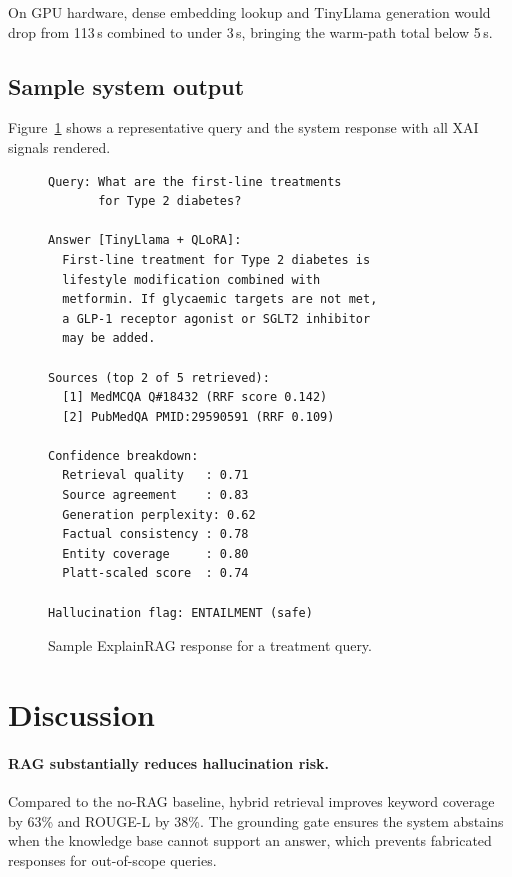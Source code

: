 \documentclass[conference,a4paper]{IEEEtran}
\begin{document}
On GPU hardware, dense embedding lookup and TinyLlama generation would
drop from 113\,s combined to under 3\,s, bringing the warm-path total
below 5\,s.

\subsection{Sample system output}

Figure~\ref{fig:sample} shows a representative query and the system
response with all XAI signals rendered.

\begin{figure}[h]
\scriptsize
\begin{verbatim}
Query: What are the first-line treatments
       for Type 2 diabetes?

Answer [TinyLlama + QLoRA]:
  First-line treatment for Type 2 diabetes is
  lifestyle modification combined with 
  metformin. If glycaemic targets are not met, 
  a GLP-1 receptor agonist or SGLT2 inhibitor 
  may be added.

Sources (top 2 of 5 retrieved):
  [1] MedMCQA Q#18432 (RRF score 0.142)
  [2] PubMedQA PMID:29590591 (RRF 0.109)

Confidence breakdown:
  Retrieval quality   : 0.71
  Source agreement    : 0.83
  Generation perplexity: 0.62
  Factual consistency : 0.78
  Entity coverage     : 0.80
  Platt-scaled score  : 0.74

Hallucination flag: ENTAILMENT (safe)
\end{verbatim}
\caption{Sample ExplainRAG response for a treatment query.}
\label{fig:sample}
\end{figure}

\section{Discussion}
\label{sec:discussion}

\paragraph{RAG substantially reduces hallucination risk.}
Compared to the no-RAG baseline, hybrid retrieval improves keyword coverage
by 63\% and ROUGE-L by 38\%.
The grounding gate ensures the system abstains when the knowledge base
cannot support an answer, which prevents fabricated responses for
out-of-scope queries.
\end{document}
